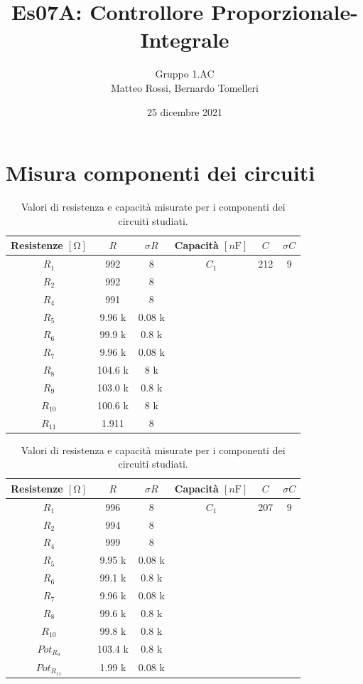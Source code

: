 \documentclass[10pt, a4paper, italian]{article}
\author{Gruppo 1.AC \\ Matteo Rossi, Bernardo Tomelleri}
\title{Es07A: Controllore Proporzionale-Integrale}
\begin{document}
\date{25 dicembre 2021}
\maketitle

\section{Misura componenti dei circuiti}
\begin{table}[htbp]
\centering
\begin{tabular}{cccccc}
\toprule
Resistenze $[\si{\ohm}]$ & $R$ & $\sigma R$ & Capacità $[\si{n\F}]$ & $C$ &
$\sigma C$ \\
\midrule
\midrule
$R_1$	  	& 992 	& 8		& $C_1$ & 212	& 9 \\
$R_2$	  	& 992	& 8		& & & \\
$R_4$	  	& 991	& 8		& & & \\
$R_5$	  	& 9.96 k	& 0.08	k& & & \\
$R_6$	  	& 99.9 k	& 0.8	k& & & \\
$R_7$	  	& 9.96 k& 0.08	k	& & & \\
$R_8$	  	& 104.6	k& 8		k& & & \\
$R_9$	  	& 103.0	k& 0.8	k	& & & \\
$R_{10}$  	& 100.6	k& 8		k& & & \\
$R_{11}$  	& 1.911	& 8		& & & \\
\bottomrule     
\end{tabular}
\caption{Valori di resistenza e capacità misurate per i componenti dei
circuiti studiati. \label{tab: rcmes_B}}

\begin{tabular}{cccccc}
\toprule
Resistenze $[\si{\ohm}]$ & $R$ & $\sigma R$ & Capacità $[\si{n\F}]$ & $C$ &
$\sigma C$ \\
\midrule
\midrule
$R_1$	  	& 996 	& 8		& $C_1$ & 207	& 9 \\
$R_2$	  	& 994	& 8		& & & \\
$R_4$	  	& 999	& 8		& & & \\
$R_5$	  	& 9.95	k& 0.08	k& & & \\
$R_6$	  	& 99.1	k& 0.8	k& & & \\
$R_7$	  	& 9.96	k& 0.08		k& & & \\
$R_8$	  	& 99.6	k& 0.8		k& & & \\
$R_{10}$  	& 99.8	k& 0.8		k& & & \\
$Pot_{R_9}$ & 103.4 k & 0.8 k& & & \\
$Pot_{R_{11}}$ & 1.99 k & 0.08 k& & &\\
\bottomrule   
\end{tabular}
\caption{Valori di resistenza e capacità misurate per i componenti dei
circuiti studiati. \label{tab: rcmes_M}}
\end{table}
\end{document}
